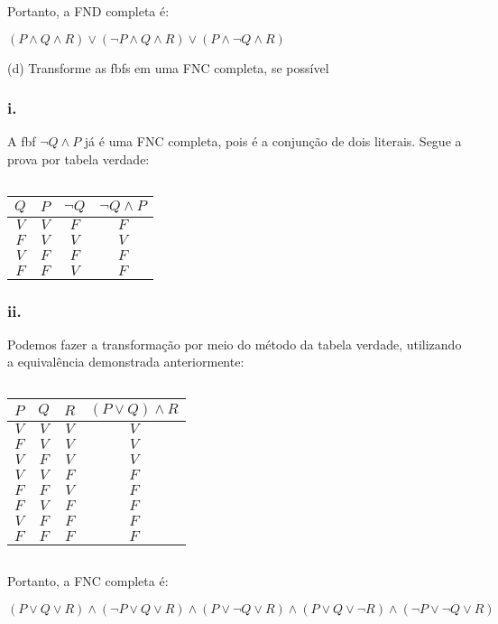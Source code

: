 $ \ $


Portanto, a FND completa é:


$(P \land Q \land R) \lor (\lnot P \land Q \land R) \lor (P \land \lnot Q \land R)$

\newpage
\noindent
(d) Transforme as fbfs em uma FNC completa, se possível

\subsubsection*{i.}
A fbf $\lnot Q \land P$ já é uma FNC completa, pois é a conjunção de dois literais. Segue a prova por tabela verdade:


$ \ $


\begin{tabular}{|c|c|c|c|}
	\hline
	$Q$ & $P$ & $\lnot Q$ & $\lnot Q \land P$ \\
	\hline
	$V$ & $V$ & $F$       & $F$               \\
	\hline
	$F$ & $V$ & $V$       & $V$               \\
	\hline
	$V$ & $F$ & $F$       & $F$               \\
	\hline
	$F$ & $F$ & $V$       & $F$               \\
	\hline
\end{tabular}
\subsubsection*{ii.}
Podemos fazer a transformação por meio do método da tabela verdade, utilizando a equivalência demonstrada anteriormente:


$ \ $


\begin{tabular}{|c|c|c|c|}
	\hline
	$P$ & $Q$ & $R$ & $(P \lor Q) \land R$ \\
	\hline
	$V$ & $V$ & $V$ & $V$                  \\
	\hline
	$F$ & $V$ & $V$ & $V$                  \\
	\hline
	$V$ & $F$ & $V$ & $V$                  \\
	\hline
	$V$ & $V$ & $F$ & $F$                  \\
	\hline
	$F$ & $F$ & $V$ & $F$                  \\
	\hline
	$F$ & $V$ & $F$ & $F$                  \\
	\hline
	$V$ & $F$ & $F$ & $F$                  \\
	\hline
	$F$ & $F$ & $F$ & $F$                  \\
	\hline
\end{tabular}


$ \ $


Portanto, a FNC completa é:

$(P \lor Q \lor R) \land (\lnot P \lor Q \lor R) \land (P \lor \lnot Q \lor R) \land (P \lor Q \lor \lnot R) \land (\lnot P \lor \lnot Q \lor R)$

